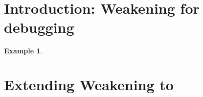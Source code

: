 \documentclass[
]{ceurart}
\newtheorem{example}{Example}
\begin{document}
\section{Introduction: Weakening for debugging}


\begin{example}
\end{example}









\section{Extending Weakening to \SROIQ}
\end{document}
